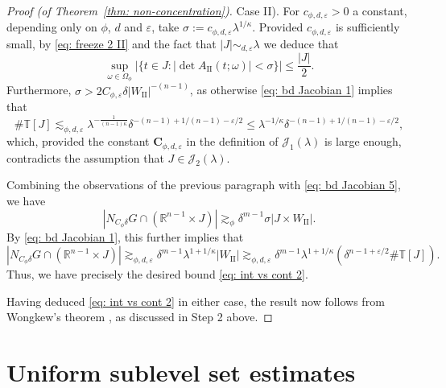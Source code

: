 \documentclass[reqno]{amsart}
\numberwithin{equation}{section}
\newcommand{\R}{\mathbb{R}}
\newcommand{\T}{\mathbb{T}}
\newcommand{\cJ}{\mathcal{J}}
\newcommand{\bC}{\mathbf{C}}
\theoremstyle{plain}
\theoremstyle{definition}
\newcommand{\tII}{\mathrm{II}}
\begin{document}
\begin{proof}[Proof (of Theorem~\ref{thm: non-concentration})]
\noindent Case II). For  $c_{\phi,d,\varepsilon} >0$ a constant, depending only on $\phi$, $d$ and $\varepsilon$, take $\sigma := c_{\phi,d,\varepsilon} \lambda^{1/\kappa}$. Provided $c_{\phi,d,\varepsilon}$ is sufficiently small, by \eqref{eq: freeze 2 II} and the fact that $|J| \sim_{d,\varepsilon} \lambda$ we deduce that 
\begin{equation*}
  \sup_{\omega \in \Omega_{\phi}}  |\{t \in J  : |\det A_{\tII}(t; \omega)| < \sigma\}| \leq \frac{|J|}{2}.
\end{equation*}
Furthermore, $\sigma>2C_{\phi, \varepsilon}\delta |W_{\tII}|^{-(n-1)}$, as otherwise \eqref{eq: bd Jacobian 1} implies that
\begin{equation*}
    \#\mathbb{T}[J]\lesssim_{\phi,d,\varepsilon}\lambda^{-\frac{1}{(n-1)\kappa}}\delta^{-(n-1) + 1/(n-1) -\varepsilon/2} \leq \lambda^{-1/\kappa}\delta^{-(n-1) + 1/(n-1) -\varepsilon/2},
\end{equation*}
which, provided the constant $\bC_{\phi,d,\varepsilon}$ in the definition of $\cJ_1(\lambda)$ is large enough, contradicts the assumption that $J\in \cJ_2(\lambda)$.

Combining the observations of the previous paragraph with \eqref{eq: bd Jacobian 5}, we have 
\begin{equation*}
  |N_{C_\phi\delta} G \cap (\R^{n-1} \times J)| \gtrsim_\phi \delta^{m-1} \sigma|J \times W_{\tII}|.
\end{equation*}
By \eqref{eq: bd Jacobian 1}, this further implies that 
\begin{equation*}
    |N_{C_\phi\delta} G \cap (\R^{n-1} \times J)|\gtrsim_{\phi, d,\varepsilon}\delta^{m-1}\lambda^{1+1/\kappa} |W_{\tII}| \gtrsim_{\phi,d,\varepsilon}  \delta^{m-1} \lambda^{1+1/\kappa} (\delta^{n-1 + \varepsilon/2}\#\T[J]).
\end{equation*}
Thus, we have precisely the desired bound \eqref{eq: int vs cont 2}.\medskip

Having deduced \eqref{eq: int vs cont 2} in either case, the result now follows from Wongkew's theorem \cite{Wongkew1993}, as discussed in Step 2 above.


\end{proof}

\section{Uniform sublevel set estimates}\label{sec: sublevel}

\end{document}
